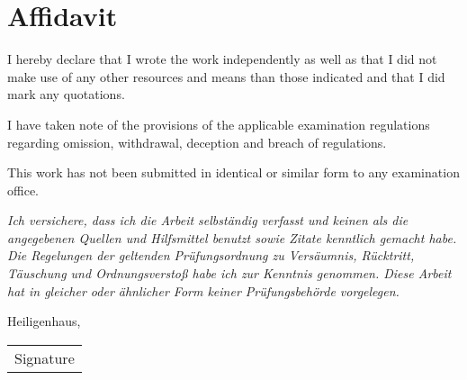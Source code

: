 \section*{Affidavit}
%
I hereby declare that I wrote the work independently as well as that I did not make use of any other resources and means than those indicated and that I did mark any quotations.
%
\bigskip

I have taken note of the provisions of the applicable examination regulations regarding omission, withdrawal, deception and breach of regulations. 
%
\bigskip

This work has not been submitted in identical or similar form to any examination office. 
%
\bigskip

\textit{Ich versichere, dass ich die Arbeit selbständig verfasst und keinen als die angegebenen Quellen und Hilfsmittel benutzt sowie Zitate kenntlich gemacht habe.
%
Die Regelungen der geltenden Prüfungsordnung zu Versäumnis, Rücktritt, Täuschung und Ordnungsverstoß habe ich zur Kenntnis genommen. 
%
Diese Arbeit hat in gleicher oder ähnlicher Form keiner Prüfungsbehörde vorgelegen.}
%
\bigskip

\vspace{3cm}
Heiligenhaus, 
\underline{\hspace*{3cm}}
\hfill 
\begin{tabular}[t]{@{}l@{}}\hline
\hspace*{2.5cm}Signature\hspace*{2.5cm}
\end{tabular}
